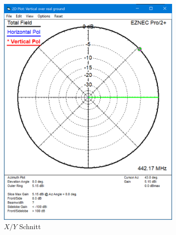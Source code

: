 \documentclass[colorlinks = true, allcolors = black, ngerman, 11pt,
a4paper, twoside, titlepage]{article}
\numberwithin{figure}{section}
\begin{document}
	\begin{figure}[h]
		\centering
		\begin{subfigure}{0.5\textwidth}
			\centering
			\includegraphics[height=1.2\textwidth]{imgs/azim_richtchar_quartwave.png}
			\caption{$X/Y$ Schnitt}
			\label{fig:azimutquartwave}
		\end{subfigure}%
		\hfil
		\begin{subfigure}{0.5\textwidth}
			\centering

\end{subfigure}
\end{figure}
\end{document}
